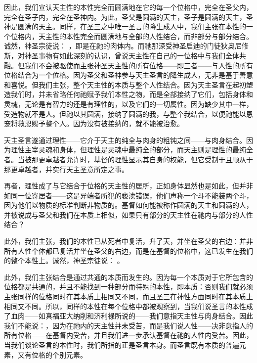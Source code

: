 因此，我们宣认天主性的本性完全而圆满地在它的每一个位格中，完全在圣父内，完全在圣子内，完全在圣神内。为此，圣父是圆满的天主，圣子是圆满的天主，圣神是圆满的天主。同样，在圣三之中唯一圣言的降生成人中，我们主张在本性的一个位格内，天主性的本性完全而圆满地与全部的人性结合，而非部分与部分结合。诚然，神圣宗徒说： ，即是在祂的肉体内。而祂那深受神圣启迪的门徒狄奥尼修斯，对神圣事物有如此深刻的认识，曾说天主性在自己的一位格中与我们全体共融。但我们不会被驱使而主张神圣天主性的所有位格——即三者——与人性的所有位格结合为一个位格。因为圣父和圣神参与天主圣言的降生成人，无非是基于善意和喜悦。但我们主张，整个天主性的本质与整个人性结合。因为天主圣言在起初塑造我们时，并未省略任何祂赋予我们本性之物，而是全部接纳了它们，包括身体和灵魂，无论是有智力的还是有理性的，以及它们的一切属性。因为缺少其中一样，受造物就不是人。但祂以其圆满，接纳了圆满的我，与整个我结合，以便祂能以恩宠将救恩赐予整个人。因为没有被接纳的，就不能被治愈。\par

天主圣言遂通过理性——它介于天主的纯全与肉身的粗钝之间——与肉身结合。因为理性主宰灵魂和身体，但理性是灵魂中最纯全的部分，而天主则是理性的最纯全者。当被那更卓越者允许时，基督的理性显示其自身的权能，但它受制于且顺从于那更卓越者，并实行天主圣意所定之事。\par

再者，理性成了与它结合于位格的天主性的居所，正如身体显然也是如此，但并非如同一位寄居者——这是异端者所犯的亵渎错误，他们声称一个斗不能装两个斗，因为他们以物质的标准判断非物质的。基督如何能被称作圆满的天主和圆满的人，并被说成与圣父和我们在本质上相似，如果只有部分的天主性在祂内与部分的人性结合？\par

此外，我们主张，我们的本性已从死者中复活，升了天，并坐在圣父的右边：并非所有人性个体都已复活并坐在圣父的右边，而是在基督的位格中，这已发生在我们的整个本性上。诚然，神圣宗徒说： 。\par

此外，我们主张结合是通过共通的本质而发生的。因为每一个本质对于它所包含的位格都是共通的，并且不能找到一种部分而特殊的本性，即本质：否则我们就必须主张同样的位格同时在其本质上相同又不同，而且圣三在神性方面同时在其本质上相同又不同。所以，同样的本性在每个位格中都被观察到，当我们说圣言的本性成了血肉——如真福亚大纳削和济利禄所说的——我们意指天主性与肉身结合。因此我们不能说：，因为在祂内的天主性并未受苦，而是我们说人性——决非意指人的所有位格——在基督内受苦，并且我们进一步承认基督在祂的人性内受苦。因此，当我们谈论圣言的本性时，我们所指的正是圣言本身。而圣言既有本质的普遍元素，又有位格的个别元素。\par

